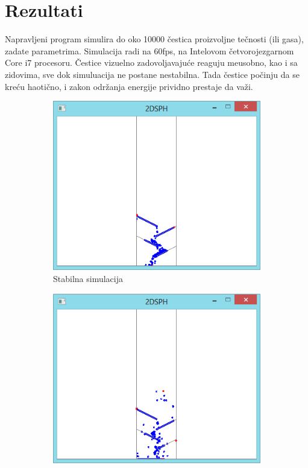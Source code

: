 \documentclass[12pt]{article}
\begin{document}
\section{Rezultati}
    Napravljeni program simulira do oko 10000 \v cestica proizvoljne te\v cnosti (ili gasa), zadate parametrima. Simulacija radi na 60fps, na Intelovom \v cetvorojezgarnom Core i7 procesoru. \v Cestice vizuelno zadovoljavaju\'ce reaguju me\dj usobno, kao i sa zidovima, sve dok simuluacija ne postane nestabilna. Tada \v cestice po\v cinju da se kre\'cu haoti\v cno, i zakon odr\v zanja energije prividno prestaje da va\v zi.
    \begin{figure}[H]
    \centering
    \begin{subfigure}[b]{0.49\textwidth}
        \centering
        \includegraphics[width=\textwidth]{figures/screenshots/1.png}
        \caption{Stabilna simulacija}
        \label{fig:Stabilna simulacija}
    \end{subfigure}
    \begin{subfigure}[b]{0.49\textwidth}
        \centering
        \includegraphics[width=\textwidth]{figures/screenshots/2.png}

\end{subfigure}
\end{figure}
\end{document}
